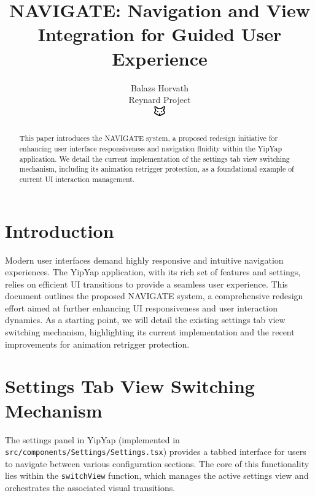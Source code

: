 \documentclass[10pt]{article}
\begin{document}
\title{NAVIGATE: Navigation and View Integration for Guided User Experience}

\author{Balazs Horvath\\
Reynard Project\\
\includegraphics[width=0.5cm]{../../shared-assets/favicon.pdf}}

\maketitle

\begin{abstract}
This paper introduces the NAVIGATE system, a proposed redesign initiative for enhancing user interface responsiveness and navigation fluidity within the YipYap application. We detail the current implementation of the settings tab view switching mechanism, including its animation retrigger protection, as a foundational example of current UI interaction management.
\end{abstract}

\section{Introduction}

Modern user interfaces demand highly responsive and intuitive navigation experiences. The YipYap application, with its rich set of features and settings, relies on efficient UI transitions to provide a seamless user experience. This document outlines the proposed NAVIGATE system, a comprehensive redesign effort aimed at further enhancing UI responsiveness and user interaction dynamics. As a starting point, we will detail the existing settings tab view switching mechanism, highlighting its current implementation and the recent improvements for animation retrigger protection.

\section{Settings Tab View Switching Mechanism}

The settings panel in YipYap (implemented in \texttt{src/components/Settings/Settings.tsx}) provides a tabbed interface for users to navigate between various configuration sections. The core of this functionality lies within the \texttt{switchView} function, which manages the active settings view and orchestrates the associated visual transitions.
\end{document}
